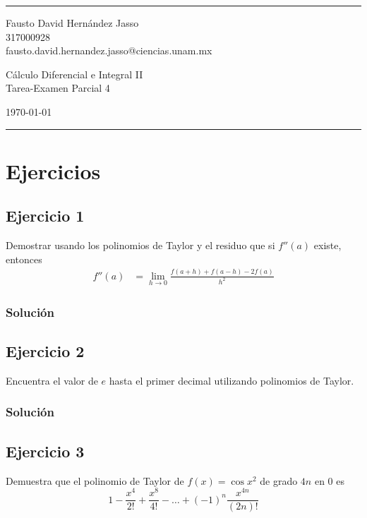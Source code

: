 \documentclass[a4paper]{article}
\begin{document}

\fancyhead[C]{}
\hrule \medskip %
\begin{minipage}{0.35\textwidth} 
\raggedright
\footnotesize
Fausto David Hernández Jasso \hfill\\   
317000928 \hfill\\
fausto.david.hernandez.jasso@ciencias.unam.mx
\end{minipage}
\begin{minipage}{0.4\textwidth} 
\centering 
\large 
Cálculo Diferencial e Integral II\\ 
\normalsize 
Tarea-Examen Parcial 4\\ 
\end{minipage}
\begin{minipage}{0.24\textwidth} 
\raggedleft
\today\hfill\\
\end{minipage}
\medskip\hrule 
\bigskip
\section{Ejercicios}
\subsection{Ejercicio 1}
\noindent
Demostrar usando los polinomios de Taylor y el residuo que si \(f''(a)\) existe, entonces
\begin{align*}
    f''(a) &= \lim_{h \to 0} \frac{f(a + h) + f(a - h) -2f(a)}{h^2}
\end{align*}
\subsubsection*{Solución}
\subsection{Ejercicio 2}
\noindent
Encuentra el valor de \(e\) hasta el primer decimal utilizando polinomios de Taylor.
\subsubsection*{Solución}
\subsection{Ejercicio 3}
\noindent
Demuestra que el polinomio de Taylor de \(f(x) = \cos{x^2}\) de grado \(4n\) en 0 es
\[
    1 - \frac{x^4}{2!} + \frac{x^8}{4!} - \dotsc + (-1)^{n}\frac{x^{4n}}{(2n)!}
\]
\end{document}
